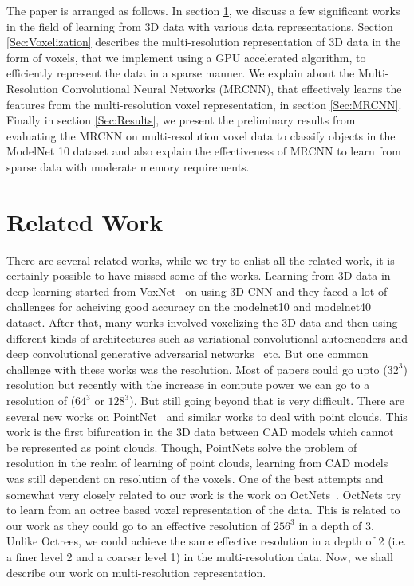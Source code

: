\documentclass[10pt,letterpaper]{article}
\begin{document}
The paper is arranged as follows. In section \ref{Sec:RelatedWork}, we discuss a few significant works in the field of learning from 3D data with various data representations. Section \ref{Sec:Voxelization} describes the multi-resolution representation of 3D data in the form of voxels, that we implement using a GPU accelerated algorithm, to efficiently represent the data in a sparse manner. We explain about the Multi-Resolution Convolutional Neural Networks (MRCNN), that effectively learns the features from the multi-resolution voxel representation, in section \ref{Sec:MRCNN}. Finally in section \ref{Sec:Results}, we present the preliminary results from evaluating the MRCNN on multi-resolution voxel data to classify objects in the ModelNet 10 dataset and also explain the effectiveness of MRCNN to learn from sparse data with moderate memory requirements.


\section{Related Work}
\label{Sec:RelatedWork}

There are several related works, while we try to enlist all the related work, it is certainly possible to have missed some of the works. Learning from 3D data in deep learning started from VoxNet~\citep{7353481} on using 3D-CNN and they faced a lot of challenges for acheiving good accuracy on the modelnet10 and modelnet40 dataset. After that, many works involved voxelizing the 3D data and then using different kinds of architectures such as variational convolutional autoencoders and deep convolutional generative adversarial networks~\citep{DBLP:journals/corr/BrockLRW16,DBLP:journals/corr/0001ZXFT16} etc. But one common challenge with these works was the resolution. Most of papers could go upto ($32^3$) resolution but recently with the increase in compute power we can go to a resolution of ($64^3 \text{ or } 128^3$). But still going beyond that is very difficult. There are several new works on PointNet~\citep{qi2017pointnet++} and similar works to deal with point clouds. This work is the first bifurcation in the 3D data between CAD models which cannot be represented as point clouds. Though, PointNets solve the problem of resolution in the realm of learning of point clouds, learning from CAD models was still dependent on resolution of the voxels. One of the best attempts and somewhat very closely related to our work is the work on OctNets~\citep{tatarchenko2017octree,riegler2016octnet}. OctNets try to learn from an octree based voxel representation of the data. This is related to our work as they could go to an effective resolution of $256^3$ in a depth of 3. Unlike Octrees, we could achieve the same effective resolution in a depth of 2 (i.e. a finer level 2 and a coarser level 1) in the multi-resolution data. Now, we shall describe our work on multi-resolution representation.
\end{document}
